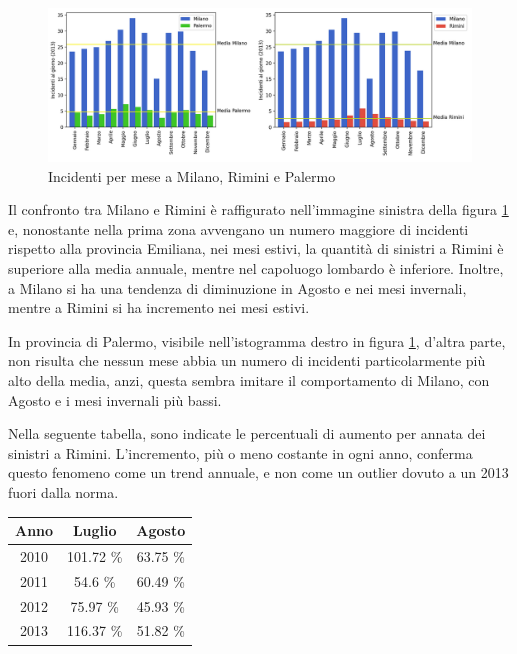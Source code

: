 \documentclass[a4paper,12pt]{report}
\begin{document}
\begin{figure}
    \includegraphics[width=\linewidth]{img_unite/milano_rimini_palermo.png}
    \caption{Incidenti per mese a Milano, Rimini e Palermo}
    \label{fig:milano-rimini}
\end{figure}

Il confronto tra Milano e Rimini è raffigurato nell'immagine sinistra della 
figura \ref{fig:milano-rimini} e, nonostante nella prima zona 
avvengano un numero maggiore di 
incidenti rispetto alla provincia Emiliana, nei mesi estivi, 
la quantità di sinistri a Rimini è superiore alla media annuale, 
mentre nel capoluogo lombardo è inferiore. 
Inoltre, a Milano si ha una tendenza di diminuzione in Agosto e nei 
mesi invernali, mentre a Rimini si ha incremento nei mesi estivi. 

In provincia di Palermo, visibile nell'istogramma destro in figura \ref{fig:milano-rimini}, 
d'altra parte, non risulta che nessun mese abbia un numero di incidenti 
particolarmente più alto della media, anzi, questa sembra imitare il comportamento di 
Milano, con Agosto e i mesi invernali più bassi. 

Nella seguente tabella, sono indicate le percentuali di aumento per annata dei sinistri 
a Rimini. 
L'incremento, più o meno costante in ogni anno, conferma questo fenomeno come un trend 
annuale, e non come un outlier dovuto a un 2013 fuori dalla norma. 

\begin{center}
    \def\arraystretch{1.5}%
    \begin{tabular}{ |c|c|c| } 
    \hline
    Anno & Luglio   & Agosto \\ 
    \hline
    \rowcolor{TableGray}
    2010 & 101.72 \% & 63.75 \% \\ 
    2011 & 54.6  \%  & 60.49 \% \\
    \rowcolor{TableGray}
    2012 & 75.97 \%  & 45.93 \%\\
    2013 & 116.37 \% & 51.82 \%\\
    \hline
    \end{tabular}
\end{center}
\end{document}
